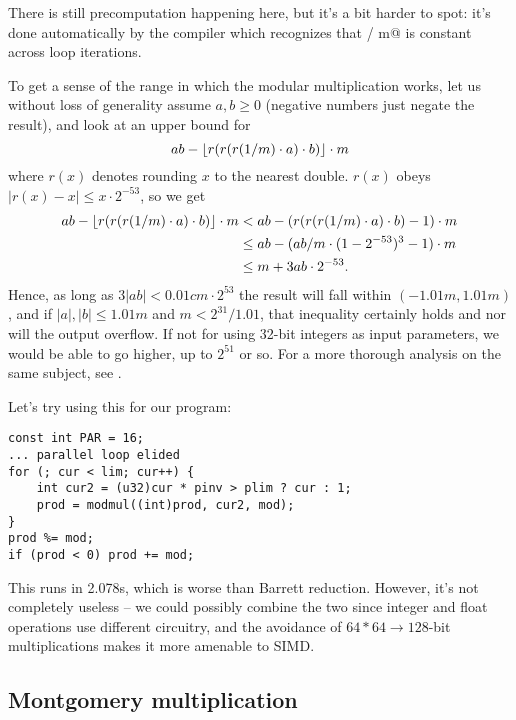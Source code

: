 There is still precomputation happening here, but it's a bit harder to spot: it's done automatically by the compiler which recognizes that  / m@ is constant across loop iterations.

To get a sense of the range in which the modular multiplication works, let us without loss of generality assume $a,b \ge 0$ (negative numbers just negate the result), and look at an upper bound for
\[ ab - \lfloor r(r(r(1/m)\cdot a)\cdot b)\rfloor \cdot m \]
where $r(x)$ denotes rounding $x$ to the nearest double.
$r(x)$ obeys $|r(x) - x| \le x \cdot 2^{-53}$, so we get
\begin{align*}
ab - \lfloor r(r(r(1/m)\cdot a)\cdot b)\rfloor \cdot m
&< ab - (r(r(r(1/m)\cdot a)\cdot b) - 1) \cdot m \\
&\le ab - (ab/m \cdot (1 - 2^{-53})^3 - 1) \cdot m \\
&\le m + 3ab \cdot 2^{-53}.
\end{align*}
Hence, as long as $3|ab| < 0.01 c m \cdot 2^{53}$ the result will fall within $(-1.01m, 1.01m)$, and if $|a|,|b| \le 1.01 m$ and $m < 2^{31} / 1.01$, that inequality certainly holds and nor will the output overflow. If not for using 32-bit integers as input parameters, we would be able to go higher, up to $2^{51}$ or so. For a more thorough analysis on the same subject, see \cite{modmulproof}.

Let's try using this for our program:

\begin{lstlisting}
const int PAR = 16;
... parallel loop elided
for (; cur < lim; cur++) {
	int cur2 = (u32)cur * pinv > plim ? cur : 1;
	prod = modmul((int)prod, cur2, mod);
}
prod %= mod;
if (prod < 0) prod += mod;
\end{lstlisting}

This runs in 2.078s, which is worse than Barrett reduction. However, it's not completely useless -- we could possibly combine the two since integer and float operations use different circuitry, and the avoidance of \mbox{$64*64\rightarrow128$}-bit multiplications makes it more amenable to SIMD.

\subsection{Montgomery multiplication}

